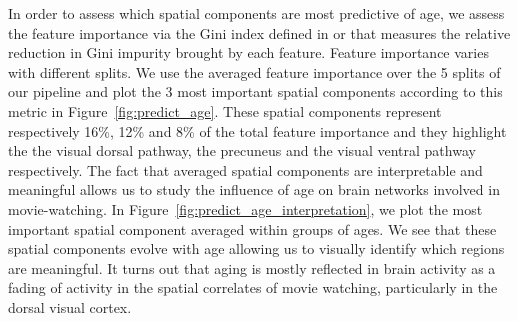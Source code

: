 In order to assess which spatial components are most predictive of age, we
assess the feature importance via the Gini index defined in
\cite{breiman2001random} or \cite{louppe2013understanding} that measures the
relative reduction in Gini impurity brought by each feature.
%
Feature importance varies with different splits. We use the averaged feature
importance over the 5 splits of our pipeline and plot the 3 most important
spatial components according to this metric in Figure~\ref{fig:predict_age}.
These spatial components represent respectively 16\%, 12\% and 8\% of the total
feature importance and they highlight the the visual dorsal pathway, the
precuneus and the visual ventral pathway respectively. 
%
The fact that averaged spatial components are interpretable and meaningful allows us to study the influence of age on brain networks involved in movie-watching.
%
In Figure~\ref{fig:predict_age_interpretation}, we plot the most important spatial component averaged within groups of ages.
%
We see that these spatial components evolve with age allowing us to visually identify which regions are meaningful. 
%
It turns out that aging is mostly reflected in brain activity as a
fading of activity in the spatial correlates of movie watching,
particularly in the dorsal visual cortex.


